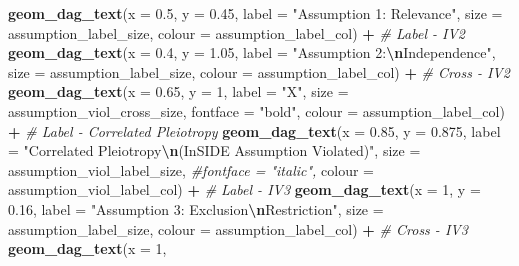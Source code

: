 \documentclass[
]{article}
\newenvironment{Shaded}{\begin{snugshade}}{\end{snugshade}}
\newcommand{\AttributeTok}[1]{\textcolor[rgb]{0.13,0.29,0.53}{#1}}
\newcommand{\CommentTok}[1]{\textcolor[rgb]{0.56,0.35,0.01}{\textit{#1}}}
\newcommand{\DecValTok}[1]{\textcolor[rgb]{0.00,0.00,0.81}{#1}}
\newcommand{\FloatTok}[1]{\textcolor[rgb]{0.00,0.00,0.81}{#1}}
\newcommand{\FunctionTok}[1]{\textcolor[rgb]{0.13,0.29,0.53}{\textbf{#1}}}
\newcommand{\NormalTok}[1]{#1}
\newcommand{\SpecialCharTok}[1]{\textcolor[rgb]{0.81,0.36,0.00}{\textbf{#1}}}
\newcommand{\StringTok}[1]{\textcolor[rgb]{0.31,0.60,0.02}{#1}}
\begin{document}
\begin{Shaded}
\begin{Highlighting}[]
  \FunctionTok{geom\_dag\_text}\NormalTok{(}\AttributeTok{x =} \FloatTok{0.5}\NormalTok{, }
                \AttributeTok{y =} \FloatTok{0.45}\NormalTok{, }
                \AttributeTok{label =} \StringTok{"Assumption 1: Relevance"}\NormalTok{, }
                \AttributeTok{size =}\NormalTok{ assumption\_label\_size, }
                \AttributeTok{colour =}\NormalTok{ assumption\_label\_col) }\SpecialCharTok{+}
  \CommentTok{\# Label {-} IV2}
  \FunctionTok{geom\_dag\_text}\NormalTok{(}\AttributeTok{x =} \FloatTok{0.4}\NormalTok{, }
                \AttributeTok{y =} \FloatTok{1.05}\NormalTok{, }
                \AttributeTok{label =} \StringTok{"Assumption 2:}\SpecialCharTok{\textbackslash{}n}\StringTok{Independence"}\NormalTok{, }
                \AttributeTok{size =}\NormalTok{ assumption\_label\_size, }
                \AttributeTok{colour =}\NormalTok{ assumption\_label\_col) }\SpecialCharTok{+}
  \CommentTok{\# Cross {-} IV2}
  \FunctionTok{geom\_dag\_text}\NormalTok{(}\AttributeTok{x =} \FloatTok{0.65}\NormalTok{, }
                \AttributeTok{y =} \DecValTok{1}\NormalTok{, }
                \AttributeTok{label =} \StringTok{"X"}\NormalTok{, }
                \AttributeTok{size =}\NormalTok{ assumption\_viol\_cross\_size,}
                \AttributeTok{fontface =} \StringTok{"bold"}\NormalTok{, }
                \AttributeTok{colour =}\NormalTok{ assumption\_label\_col) }\SpecialCharTok{+}
  \CommentTok{\# Label {-} Correlated Pleiotropy}
  \FunctionTok{geom\_dag\_text}\NormalTok{(}\AttributeTok{x =} \FloatTok{0.85}\NormalTok{, }
                \AttributeTok{y =} \FloatTok{0.875}\NormalTok{, }
                \AttributeTok{label =} \StringTok{"Correlated Pleiotropy}\SpecialCharTok{\textbackslash{}n}\StringTok{(InSIDE Assumption Violated)"}\NormalTok{, }
                \AttributeTok{size =}\NormalTok{ assumption\_viol\_label\_size,}
                \CommentTok{\#fontface = "italic", }
                \AttributeTok{colour =}\NormalTok{ assumption\_viol\_label\_col) }\SpecialCharTok{+}
  \CommentTok{\# Label {-} IV3}
  \FunctionTok{geom\_dag\_text}\NormalTok{(}\AttributeTok{x =} \DecValTok{1}\NormalTok{, }
                \AttributeTok{y =} \FloatTok{0.16}\NormalTok{, }
                \AttributeTok{label =} \StringTok{"Assumption 3: Exclusion}\SpecialCharTok{\textbackslash{}n}\StringTok{Restriction"}\NormalTok{, }
                \AttributeTok{size =}\NormalTok{ assumption\_label\_size, }
                \AttributeTok{colour =}\NormalTok{ assumption\_label\_col) }\SpecialCharTok{+}
  \CommentTok{\# Cross {-} IV3}
  \FunctionTok{geom\_dag\_text}\NormalTok{(}\AttributeTok{x =} \DecValTok{1}\NormalTok{, }

\end{Highlighting}
\end{Shaded}
\end{document}
